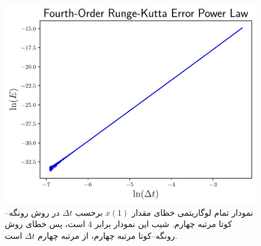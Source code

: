\documentclass[12pt,a4paper]{article}
\begin{document}
	\begin{figure}[h!]
		\centering
		\includegraphics[width=\linewidth]{fig/rk4-error-loglog}
		\caption{نمودار تمام لوگاریتمی خطای مقدار $x(1)$ برحسب $\Delta{t}$ در روش رونگه--کوتا مرتبه چهارم.
			شیب این نمودار برابر $4$ است، پس خطای روش رونگه--کوتا مرتبه چهارم، از مرتبه چهارم $\Delta{t}$ است.}
	\end{figure}
\end{document}
